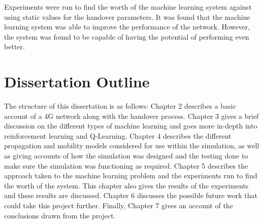 Experiments were run to find the worth of the machine learning system against using static values for the handover parameters. It was found that the machine learning system was able to improve the performance of the network. However, the system was found to be capable of having the potential of performing even better.   
\section{Dissertation Outline}
The structure of this dissertation is as follows: Chapter 2 describes a basic account of a 4G network along with the handover process. Chapter 3 gives a brief discussion on the different types of machine learning and goes more in-depth into reinforcement learning and Q-Learning. Chapter 4 describes the different propagation and mobility models considered for use within the simulation, as well as giving accounts of how the simulation was designed and the testing done to make sure the simulation was functioning as required. Chapter 5 describes the approach taken to the machine learning problem and the experiments run to find the worth of the system. This chapter also gives the results of the experiments and these results are discussed. Chapter 6 discusses the possible future work that could take this project further. Finally, Chapter 7 gives an account of the conclusions drawn from the project.